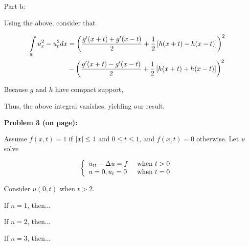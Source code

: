 \documentclass[a4paper,12pt]{article}
\begin{document}
\shunt

Part b:

Using the above, consider that 

\begin{align*}
\int\limits_{\mathbb{R}} u_x^2 - u_t^2 dx &= \left(\frac{g'(x+t)+g'(x-t)}{2} + \frac{1}{2}\left[h(x+t) - h(x-t)\right]\right)^2 \\
&- \left(\frac{g'(x+t)-g'(x-t)}{2} + \frac{1}{2}\left[h(x+t) + h(x-t)\right]\right)^2
\end{align*}

Because $g$ and $h$ have compact support, %

Thus, the above integral vanishes, yielding our result.

\shunt

{\bf Problem 3 (on page):}

Assume $f(x,t) = 1$ if $\left\lvert x \right\rvert \leq 1$ and $0\leq t \leq 1$, and $f(x,t) = 0$ otherwise. Let $u$ solve

\begin{displaymath}
   \left\{
     \begin{array}{lr}
       u_{tt} - \Delta u = f  & \text{ when } t>0 \\
       u=0, u_t = 0 & \text{ when } t=0 \\
     \end{array}
   \right.
\end{displaymath}

Consider $u(0,t)$ when $t>2$.

If $n = 1$, then... %

If $n = 2$, then...

If $n = 3$, then... %

\shunt
\end{document}
